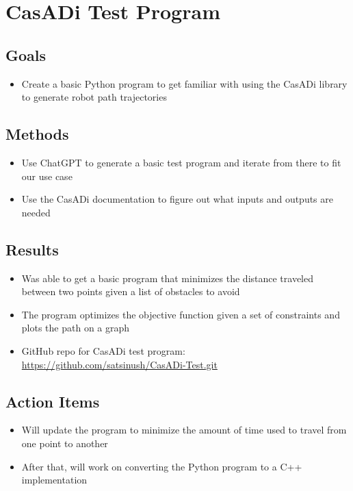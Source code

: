 \section{CasADi Test Program}

\subsection{Goals}
\begin{itemize}
    \item Create a basic Python program to get familiar with using the CasADi library to generate robot path trajectories
\end{itemize}

\subsection{Methods}
\begin{itemize}
    \item Use ChatGPT to generate a basic test program and iterate from there to fit our use case
    \item Use the CasADi documentation to figure out what inputs and outputs are needed 
\end{itemize}

\subsection{Results}
\begin{itemize}
    \item Was able to get a basic program that minimizes the distance traveled between two points given a list of obstacles to avoid
    \item The program optimizes the objective function given a set of constraints and plots the path on a graph
    \item GitHub repo for CasADi test program: \href{https://github.com/satsinush/CasADi-Test.git}{https://github.com/satsinush/CasADi-Test.git}
\end{itemize}

\subsection{Action Items}
\begin{itemize}
    \item Will update the program to minimize the amount of time used to travel from one point to another
    \item After that, will work on converting the Python program to a C++ implementation
\end{itemize}